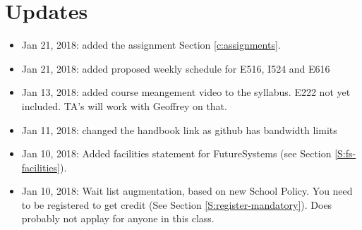 
\chapter{Updates}

\begin{itemize}

\item Jan 21, 2018: added the assignment Section \ref{c:assignments}.

\item Jan 21, 2018: added proposed weekly schedule for E516, I524 and E616

\item Jan 13, 2018: added course meangement video to the
  syllabus. E222 not yet included. TA's will work with Geoffrey on that.

\item Jan 11, 2018: changed the handbook link as github has bandwidth limits

\item Jan 10, 2018: Added facilities statement for FutureSystems
  (see Section \ref{S:fs-facilities}).

\item Jan 10, 2018:  Wait list augmentation, based on new School
  Policy. You need to be registered to get credit (See Section
  \ref{S:register-mandatory}). Does probably not applay for anyone in
  this class. 

\end{itemize}
